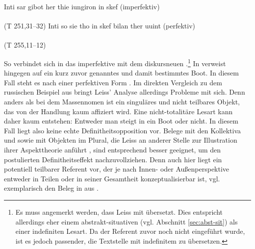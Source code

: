 \begin{exe}
	\ex \label{ex:gi-stigan}   
	\begin{xlist}
		\ex \label{ex:stigan} Inti sar gibot her thie iungiron  in skef  \hfill (imperfektiv) \\ 
		 \\ (T 251,31--32)
		\ex \label{ex:gistigan} Inti so sie tho  in skef bilan ther uuint \hfill (perfektiv) \\   \\ (T 255,11--12)
		\end{xlist}
\end{exe}
\noindent
So verbindet sich in  das imperfektive    mit dem diskursneuen .\footnote{Es muss angemerkt werden, dass Leiss  mit  übersetzt. Dies entspricht allerdings eher einem abstrakt-situativen   (vgl. Abschnitt \ref{sec:abst-sit}) als einer indefiniten  Lesart. Da der Referent zuvor noch nicht eingeführt wurde, ist es jedoch passender, die Textstelle mit indefinitem  zu übersetzen.} In  verweist  hingegen auf ein kurz zuvor genanntes und damit bestimmtes Boot. In diesem Fall steht es nach einer perfektiven  Form .
Im direkten Vergleich zu dem russischen Beispiel aus  bringt Leiss' Analyse allerdings Probleme mit sich. Denn anders als bei dem Massennomen   ist  ein singuläres und nicht teilbares Objekt, das von der Handlung  kaum affiziert wird. Eine nicht-totalitäre Lesart kann daher kaum entstehen: Entweder man steigt in ein Boot oder nicht. In diesem Fall liegt also keine echte Definitheitsopposition  vor. 
Belege mit den Kollektiva    und   sowie mit Objekten  im Plural, die Leiss an anderer Stelle zur Illustration ihrer Aspekttheorie  anführt \parencite[170--174]{Leiss2000}, sind entsprechend besser geeignet, um den postulierten Definitheitseffekt  nachzuvollziehen. Denn auch hier liegt ein potentiell teilbarer Referent vor, der je nach Innen- oder Außenperspektive entweder in Teilen oder in seiner Gesamtheit konzeptualisierbar ist, vgl. exemplarisch den Beleg in  aus \textcite[170]{Leiss2000}. 


